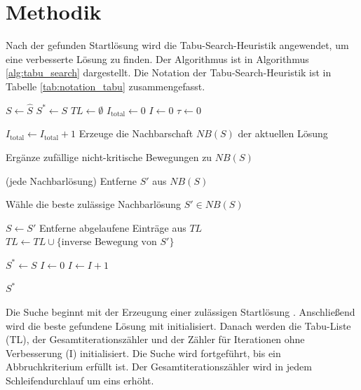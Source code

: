\section{Methodik}
\label{sec:methodik}

Nach der gefunden Startlösung wird die Tabu-Search-Heuristik angewendet, um eine verbesserte Lösung zu finden. Der Algorithmus ist in Algorithmus \ref{alg:tabu_search} dargestellt. Die Notation der Tabu-Search-Heuristik ist in Tabelle \ref{tab:notation_tabu} zusammengefasst.

\begin{algorithm}[H]
\caption{Tabu Search für das Job-Shop-Scheduling-Problem mit sequenzabhängigen Rüstzeiten}
\label{alg:tabu_search}

\begin{algorithmic}[1]

\State $S \gets \hat{S}$
\State $S^\ast \gets S$
\State $TL \gets \emptyset$
\State $I_{\text{total}} \gets 0$
\State $I \gets 0$
\State $\tau \gets 0$

    \State $I_{\text{total}} \gets I_{\text{total}} + 1$
    \State Erzeuge die Nachbarschaft $NB(S)$ der aktuellen Lösung

        \State Ergänze zufällige nicht-kritische Bewegungen zu $NB(S)$
    \EndIf

     (jede Nachbarlösung)
            \State Entferne $S'$ aus $NB(S)$
        \EndIf
    \EndFor

    \State Wähle die beste zulässige Nachbarlösung $S' \in NB(S)$

    \State $S \gets S'$
    \State Entferne abgelaufene Einträge aus $TL$
    \State $TL \gets TL \cup \{\text{inverse Bewegung von } S'\}$

        \State $S^\ast \gets S$
        \State $I \gets 0$
    \Else
        \State $I \gets I + 1$
    \EndIf
\EndWhile

\State \Return $S^\ast$

\end{algorithmic}
\end{algorithm}

Die Suche beginnt mit der Erzeugung einer zulässigen Startlösung . Anschließend wird die beste gefundene Lösung mit  initialisiert. Danach werden die Tabu-Liste (TL), der Gesamtiterationszähler und der Zähler für Iterationen ohne Verbesserung (I) initialisiert. Die Suche wird fortgeführt, bis ein Abbruchkriterium erfüllt ist. Der Gesamtiterationszähler wird in jedem Schleifendurchlauf um eins erhöht.
 
